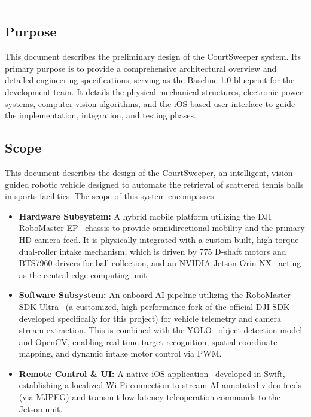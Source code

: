 \label{sec:intro}

\textcolor{gray}{\rule{\linewidth}{3pt}}


\subsection{Purpose}
\label{sec:purpose}
This document describes the preliminary design of the CourtSweeper system. Its primary purpose is to provide a comprehensive architectural overview and detailed engineering specifications, serving as the Baseline 1.0 blueprint for the development team. It details the physical mechanical structures, electronic power systems, computer vision algorithms, and the iOS-based user interface to guide the implementation, integration, and testing phases.


\subsection{Scope}
This document describes the design of the CourtSweeper, an intelligent, vision-guided robotic vehicle designed to automate the retrieval of scattered tennis balls in sports facilities. The scope of this system encompasses:
\begin{itemize}
  \item \textbf{Hardware Subsystem:} A hybrid mobile platform utilizing the DJI RoboMaster EP~\cite{robomaster_ep} chassis to provide omnidirectional mobility and the primary HD camera feed. It is physically integrated with a custom-built, high-torque dual-roller intake mechanism, which is driven by 775 D-shaft motors and BTS7960 drivers for ball collection, and an NVIDIA Jetson Orin NX~\cite{jetson_orin} acting as the central edge computing unit.
  \item \textbf{Software Subsystem:} An onboard AI pipeline utilizing the RoboMaster-SDK-Ultra~\cite{robomaster_sdk_ultra} (a customized, high-performance fork of the official DJI SDK developed specifically for this project) for vehicle telemetry and camera stream extraction. This is combined with the YOLO~\cite{yolo26} object detection model and OpenCV, enabling real-time target recognition, spatial coordinate mapping, and dynamic intake motor control via PWM.
  \item \textbf{Remote Control \& UI:} A native iOS application~\cite{apple_doc} developed in Swift, establishing a localized Wi-Fi connection to stream AI-annotated video feeds (via MJPEG) and transmit low-latency teleoperation commands to the Jetson unit.
\end{itemize}


